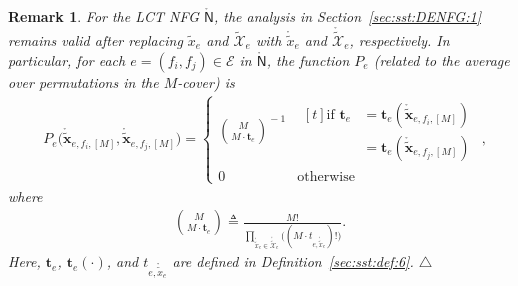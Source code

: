 \documentclass[journal]{IEEEtran}
\newcommand{\add}[1]{{\color{black}#1}}
\newtheorem{remark}[theorem]{Remark}
\newcommand{\manualendsymbol}[1]{%
  \leavevmode\unskip\penalty9999\hbox{}\nobreak\hfill
  \quad\hbox{#1}}
\newcommand{\eremark}{\manualendsymbol{\ensuremath{\triangle}}}
\newcommand{\vect}[1]{ \bm{#1} }
\newcommand{\setEfull}{ \mathcal{E} }
\newcommand{\sfN}{ \mathsf{N} }
\newcommand{\vt}{ \vect{t} }
\newcommand{\defeq}{ \triangleq }
\newcommand{\tset}[1]{\tilde{\mathcal{#1}}}
\newcommand{\LCTtset}[1]{\mathring{\tilde{\mathcal{#1}}}}
\newcommand{\LCTtv}[1]{ \mathring{ \tilde{ \vect{#1} } } }
\newcommand{\LCT}[1]{ \mathring{#1} }
\newcommand{\LCTt}[1]{ \mathring{ \tilde{#1} } }
\newcommand{\efi}{ e,f_i }
\newcommand{\efj}{ e,f_j }
\newcommand{\txe}{ \tilde{x}_{e} }
\begin{document}
\begin{appendices}
  \begin{remark}
    \label{remark: expression of Pe}
    For the LCT NFG $ \LCT{\sfN} $, the analysis in
    Section~\ref{sec:sst:DENFG:1} remains valid after replacing $ \txe $ and
    $ \tset{X}_{e} $ with $ \LCTt{x}_{e} $ and $ \LCTtset{X}_{e} $,
    respectively.  In particular, for each $ e = (f_{i},f_{j}) \in \setEfull $
    in $ \LCT{\sfN} $, the function $ P_{e} $ (related to the average over
    permutations in the $M$-cover) is
    \begin{align*}
       & P_{e}\bigl( \LCTtv{x}_{\efi,[M]}, \LCTtv{x}_{\efj,[M]} \bigr)
      =\begin{cases}
         \binom{M}{ M \cdot \vt_{e} }^{\!\! -1}
           & \begin{aligned}[t]
               \text{if } \vt_{e}
                & =\vt_e(\LCTtv{x}_{\efi,[M]})  \\
                & = \vt_e(\LCTtv{x}_{\efj,[M]})
             \end{aligned} \\
         0 & \text{otherwise}
       \end{cases},
    \end{align*}
    where
    \begin{align*}
      \binom{M}{ M \cdot \vt_{e} }
      \defeq \frac{M!}{ \prod\limits_{\LCTt{x}_{e} \in \LCTtset{X}_{e}}
               \bigl( ( M \cdot t_{e,\LCTt{x}_{e}} ) ! \bigr) }.
    \end{align*}
    \add{Here, $ \vt_{e} $, $ \vt_{e}(\cdot) $, and $ t_{e,\LCTt{x}_{e}} $ are defined in Definition~\ref{sec:sst:def:6}.}
    \eremark
  \end{remark}


\end{appendices}
\end{document}
